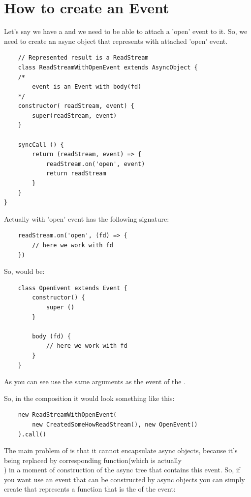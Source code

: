 \documentclass{article}
\begin{document}
\section{How to create an Event}

Let's say we have a  and we need to be able to attach a 'open' event to it. So, we need to create an async object  that represents  with attached 'open' event.

\begin{verbatim}
    // Represented result is a ReadStream
    class ReadStreamWithOpenEvent extends AsyncObject {
    /*
        event is an Event with body(fd)
    */
    constructor( readStream, event) {
        super(readStream, event)
    }

    syncCall () {
        return (readStream, event) => {
            readStream.on('open', event)
            return readStream
        }
    }
}
\end{verbatim}

Actually  with 'open' event has the following signature:

\begin{verbatim}
    readStream.on('open', (fd) => {
        // here we work with fd  
    })
\end{verbatim}

So,  would be:

\begin{verbatim}
    class OpenEvent extends Event {
        constructor() {
            super ()
        }

        body (fd) {
            // here we work with fd
        }
    }
\end{verbatim}

As you can see  use the same arguments as the event of the . 

So, in the composition it would look something like this:

\begin{verbatim}
    new ReadStreamWithOpenEvent(
        new CreatedSomeHowReadStream(), new OpenEvent()
    ).call()
\end{verbatim}

The main problem of  is that it cannot encapsulate async objects, because it's being replaced by corresponding function(which is actually \\ ) in a moment of construction of the async tree that contains this event. So, if you want use an event that can be constructed by async objects you can simply create  that represents a function that is the  of the event:
\end{document}

